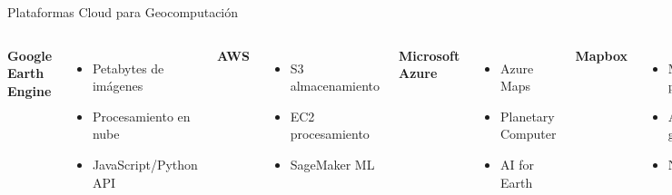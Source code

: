 \documentclass[10pt]{beamer}
\begin{document}
\begin{frame}{Plataformas Cloud para Geocomputación}
    \begin{columns}
        \textbf{ Google Earth Engine}
        \begin{itemize}
            \item Petabytes de imágenes
            \item Procesamiento en nube
            \item JavaScript/Python API
        \end{itemize}
        
        \vspace{0.3cm}
        \textbf{ AWS}
        \begin{itemize}
            \item S3 almacenamiento
            \item EC2 procesamiento
            \item SageMaker ML
        \end{itemize}
        
        \textbf{ Microsoft Azure}
        \begin{itemize}
            \item Azure Maps
            \item Planetary Computer
            \item AI for Earth
        \end{itemize}
        
        \vspace{0.3cm}
        \textbf{ Mapbox}
        \begin{itemize}
            \item Mapas personalizados
            \item APIs geocoding
            \item Navegación
        \end{itemize}
    \end{columns}
\end{frame}
\end{document}
